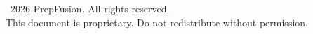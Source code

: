 \begin{titlepage}
\begin{center}
  \end{center}

  \vfill

  \begin{center}
    {\small\sffamily
      \textcopyright\ 2026 PrepFusion. All rights reserved.\\
      This document is proprietary. Do not redistribute without permission.}
  \end{center}

\end{titlepage}

\nopagecolor
\color{black}
